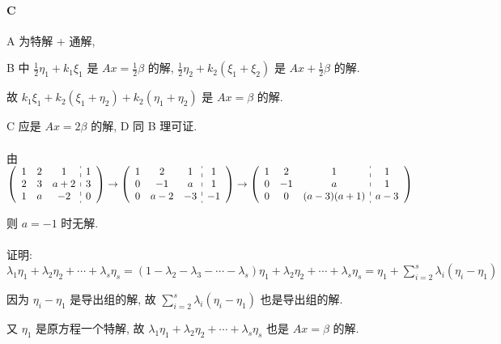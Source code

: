 	 \paragraph{C}
		 A 为特解 + 通解,

		 B 中 \( \frac{1}{2}\eta_{1} + k_{1}\xi_{1} \) 是 \( Ax = \frac{1}{2}\beta \) 的解, \(\frac{1}{2}\eta_2+k_2(\xi_1+\xi_2)\) 是 \(Ax+\frac{1}{2}\beta\) 的解.

		 故 \( k_{1}\xi_{1} + k_{2}(\xi_{1}+\eta_{2}) + k_{2}(\eta_{1}+\eta_{2}) \) 是 \( Ax = \beta \) 的解.

		 C 应是 \( Ax = 2\beta \) 的解, D 同 B 理可证.


	 \paragraph{} %
		 由 \( \left(\begin{array}{ccc:c}
				 1 & 2 & 1   & 1 \\
				 2 & 3 & a+2 & 3 \\
				 1 & a & -2  & 0
			 \end{array}\right)
		 \to
		 \left(\begin{array}{ccc:c}
				 1 & 2   & 1  & 1  \\
				 0 & -1  & a  & 1  \\
				 0 & a-2 & -3 & -1
			 \end{array}\right)
		 \to
		 \left(\begin{array}{ccc:c}
				 1 & 2  & 1          & 1   \\
				 0 & -1 & a          & 1   \\
				 0 & 0  & (a-3)(a+1) & a-3
			 \end{array}\right) \)

		 则 \( a = -1 \) 时无解.


	 \paragraph{} %
		 证明: \( \lambda_{1}\eta_{1} + \lambda_{2}\eta_{2} + \cdots + \lambda_{s}\eta_{s} = (1-\lambda_{2}-\lambda_{3}-\cdots-\lambda_{s})\eta_{1} + \lambda_{2}\eta_{2} + \cdots + \lambda_{s}\eta_{s} = \eta_{1} + \sum_{i=2}^{s}\lambda_{i}(\eta_{i}-\eta_{1}) \)

		 因为 \( \eta_{i}-\eta_{1} \) 是导出组的解, 故 \( \sum_{i=2}^{s}\lambda_{i}(\eta_{i}-\eta_{1}) \) 也是导出组的解.

		 又 \( \eta_{1} \) 是原方程一个特解, 故 \( \lambda_{1}\eta_{1} + \lambda_{2}\eta_{2} + \cdots + \lambda_{s}\eta_{s} \) 也是 \( Ax = \beta \) 的解.


